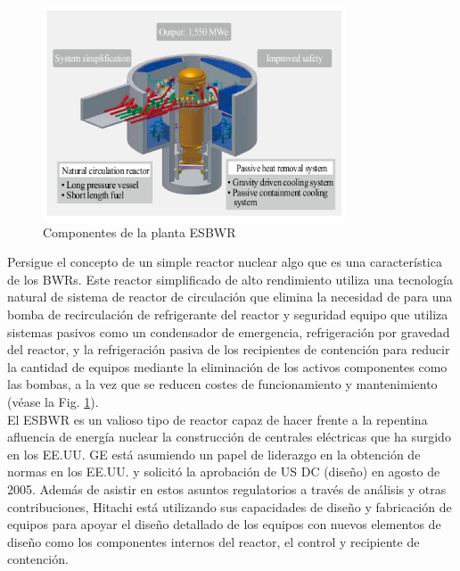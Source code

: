 \documentclass[]{article}
\begin{document}
\begin{figure}[h!]
	\centering
	\includegraphics[width=0.8\textwidth]{ReactorESBWR.png}
	\caption{Componentes de la planta ESBWR}
	\label{fig:ReactorESBWR}
\end{figure}


Persigue el concepto de un simple reactor nuclear algo que es una característica de los BWRs. Este reactor simplificado de alto rendimiento utiliza una tecnología natural de
sistema de reactor de circulación que elimina la necesidad de
para una bomba de recirculación de refrigerante del reactor y seguridad
equipo que utiliza sistemas pasivos como un
condensador de emergencia, refrigeración por gravedad del reactor,
y la refrigeración pasiva de los recipientes de contención para reducir
la cantidad de equipos mediante la eliminación de los activos
componentes como las bombas, a la vez que se reducen
costes de funcionamiento y mantenimiento (véase la Fig. \ref{fig:ReactorESBWR}).\\


El ESBWR es un valioso tipo de reactor capaz de hacer frente a la repentina afluencia de energía nuclear la construcción de centrales eléctricas que ha surgido en los EE.UU.
GE está asumiendo un papel de liderazgo en la obtención de normas en los EE.UU. y solicitó la aprobación de US DC (diseño) en agosto de 2005. Además de asistir en estos asuntos regulatorios a través de análisis y otras contribuciones, Hitachi está utilizando sus capacidades de diseño y fabricación de equipos para apoyar el diseño detallado de los equipos con nuevos elementos de diseño como los componentes internos del reactor, el control
y recipiente de contención.\\
\end{document}
